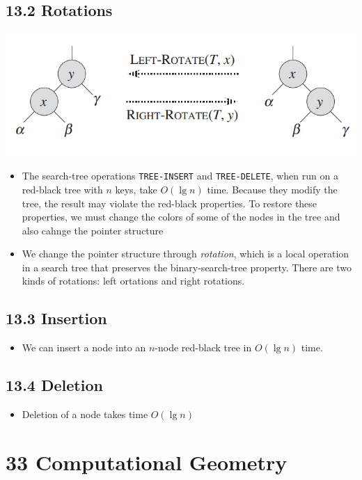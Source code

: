 \documentclass{report}
\begin{document}
\subsection*{13.2 Rotations}
\begin{center}
    \includegraphics[height = 3 cm]{../entities/fig_13_2.png}
\end{center}
\begin{itemize}
    \item The search-tree operations \texttt{TREE-INSERT} and \texttt{TREE-DELETE}, when run on a red-black tree with $n$ keys, take $O(\lg n)$ time. Because they modify the tree, the result may violate the red-black properties. To restore these properties, we must change the colors of some of the nodes in the tree and also cahnge the pointer structure
    \item We change the pointer structure through \textit{rotation}, which is a local operation in a search tree that preserves the binary-search-tree property. There are two kinds of rotations: left ortations and right rotations.
\end{itemize}
\subsection*{13.3 Insertion}
\begin{itemize}
    \item We can insert a node into an $n$-node red-black tree in $O(\lg n)$ time.
\end{itemize}
\subsection*{13.4 Deletion}
\begin{itemize}
    \item Deletion of a node takes time $O(\lg n)$
\end{itemize}
\section*{33 Computational Geometry}
\end{document}
